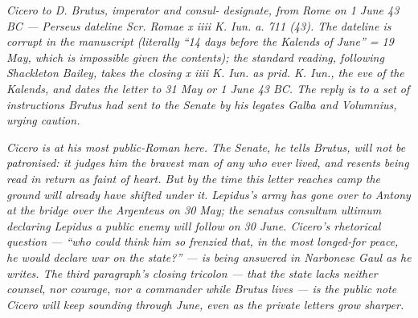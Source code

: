 
\textit{Cicero to D. Brutus, \textit{imperator} and consul-
designate, from Rome on 1 June 43 BC --- Perseus dateline
\textit{Scr. Romae x iiii K. Iun. a. 711 (43)}. The dateline
is corrupt in the manuscript (literally ``14 days before
the Kalends of June'' = 19 May, which is impossible given
the contents); the standard reading, following Shackleton
Bailey, takes the closing \textit{x iiii K. Iun.} as
\textit{prid. K. Iun.}, the eve of the Kalends, and dates
the letter to 31 May or 1 June 43 BC. The reply is to a set
of instructions Brutus had sent to the Senate by his
legates Galba and Volumnius, urging caution.}

\textit{Cicero is at his most public-Roman here. The
Senate, he tells Brutus, will not be patronised: it judges
him the bravest man of any who ever lived, and resents
being read in return as faint of heart. But by the time
this letter reaches camp the ground will already have
shifted under it. Lepidus's army has gone over to Antony
at the bridge over the Argenteus on 30 May; the
\textit{senatus consultum ultimum} declaring Lepidus a
public enemy will follow on 30 June. Cicero's rhetorical
question --- ``who could think him so frenzied that, in
the most longed-for peace, he would declare war on the
state?'' --- is being answered in Narbonese Gaul as he
writes. The third paragraph's closing tricolon --- that
the state lacks neither counsel, nor courage, nor a
commander while Brutus lives --- is the public note
Cicero will keep sounding through June, even as the
private letters grow sharper.}
